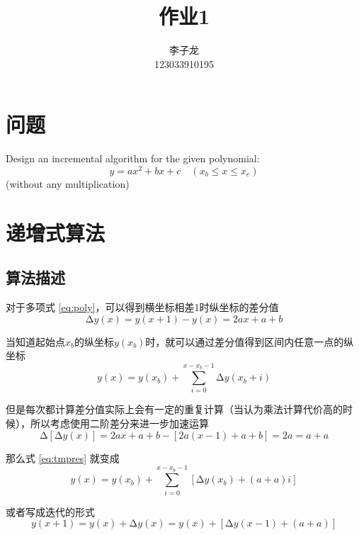 \documentclass[math-font=newcm]{sjtuarticle}
\title{作业1}
\author{李子龙\\123033910195}
\begin{document}
\maketitle

\tableofcontents*
\clearpage

\section{问题}

Design an incremental algorithm for the given polynomial:
\begin{equation}\label{eq:poly}
    y=ax^2+bx+c\quad(x_b\leq x\leq x_e)
\end{equation}
(without any multiplication)

\section{递增式算法}

\subsection{算法描述}

对于多项式 \eqref{eq:poly}，可以得到横坐标相差1时纵坐标的差分值
\begin{equation}
    \increment y(x)=y(x+1)-y(x)=2ax+a+b
\end{equation}

当知道起始点$x_b$的纵坐标$y(x_b)$时，就可以通过差分值得到区间内任意一点的纵坐标
\begin{equation}\label{eq:tmpres}
    y(x)=y(x_b)+\sum_{i=0}^{x-x_b-1}\increment y(x_b+i)
\end{equation}

但是每次都计算差分值实际上会有一定的重复计算（当认为乘法计算代价高的时候），所以考虑使用二阶差分来进一步加速运算
\begin{equation}
    \increment[\increment y(x)]=2ax+a+b-[2a(x-1)+a+b]=2a=a+a
\end{equation}

那么式 \eqref{eq:tmpres} 就变成
\begin{equation}\label{eq:res}
    y(x)=y(x_b)+\sum_{i=0}^{x-x_b-1}[\increment y(x_b)+(a+a)i]
\end{equation}

或者写成迭代的形式
\begin{equation}
    y(x+1)=y(x)+\increment y(x)=y(x)+[\increment y(x-1)+(a+a)]
\end{equation}
\end{document}
